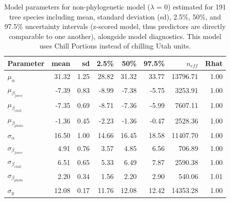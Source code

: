 \documentclass[11pt]{article}
\begin{document}
\begin{table}[ht]
\centering
\caption{Model parameters for non-phylogenetic model ($\lambda$ = 0) estimated for 191 tree species including mean, standard deviation (sd), 2.5\%, 50\%, and 97.5\% uncertainty intervals (z-scored model, thus predictors are directly comparable to one another), alongside model diagnostics. This model uses Chill Portions instead of chilling Utah units.} 
\label{tab:modlamb0chillports}
\begingroup\footnotesize
\begin{tabular}{lrrrrrrr}
  \hline
Parameter & mean & sd & 2.5\% & 50\% & 97.5\% & $n_{eff}$ & Rhat \\ 
  \hline
$\mu_{\alpha}$ & 31.32 & 1.25 & 28.82 & 31.32 & 33.77 & 13796.71 & 1.00 \\ 
  $\mu_{\beta_{force}}$ & -7.39 & 0.83 & -8.99 & -7.38 & -5.75 & 3253.91 & 1.00 \\ 
  $\mu_{\beta_{chill}}$ & -7.35 & 0.69 & -8.71 & -7.36 & -5.99 & 7607.11 & 1.00 \\ 
  $\mu_{\beta_{photo}}$ & -1.36 & 0.45 & -2.23 & -1.36 & -0.47 & 2528.36 & 1.00 \\ 
  $\sigma_{\alpha}$ & 16.50 & 1.00 & 14.66 & 16.45 & 18.58 & 11407.70 & 1.00 \\ 
  $\sigma_{\beta_{force}}$ & 4.91 & 0.76 & 3.57 & 4.85 & 6.56 & 706.89 & 1.00 \\ 
  $\sigma_{\beta_{chill}}$ & 6.51 & 0.65 & 5.33 & 6.49 & 7.87 & 2590.38 & 1.00 \\ 
  $\sigma_{\beta_{photo}}$ & 2.20 & 0.34 & 1.56 & 2.20 & 2.90 & 540.06 & 1.01 \\ 
  $\sigma_y$ & 12.08 & 0.17 & 11.76 & 12.08 & 12.42 & 14353.28 & 1.00 \\ 
   \hline
\end{tabular}
\endgroup
\end{table} \clearpage \pagebreak 
\end{document}
